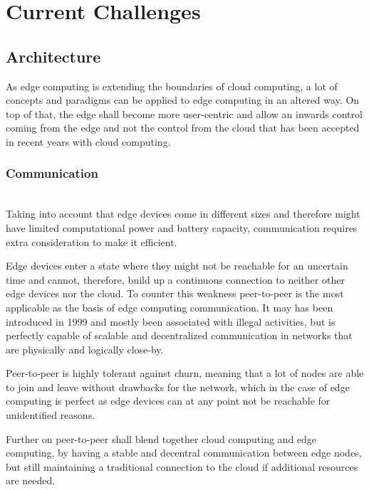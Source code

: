 \section{Current Challenges}\label{sec:main}

\subsection{Architecture}
As edge computing is extending the boundaries of cloud computing, a lot of concepts and paradigms can be applied to edge computing in an altered way. On top of that, the edge shall become more user-centric and allow an inwards control coming from the edge and not the control from the cloud that has been accepted in recent years with cloud computing.

\subsubsection{Communication}\hspace*{\fill} \\
Taking into account that edge devices come in different sizes and therefore might have limited computational power and battery capacity, communication requires extra consideration to make it efficient.

Edge devices enter a state where they might not be reachable for an uncertain time and cannot, therefore, build up a continuous connection to neither other edge devices nor the cloud.
To counter this weakness peer-to-peer is the most applicable as the basis of edge computing communication. It may has been introduced in 1999 and mostly been associated with illegal activities, but is perfectly capable of scalable and decentralized communication in networks that are physically and logically close-by. 

Peer-to-peer is highly tolerant against churn, meaning that a lot of nodes are able to join and leave without drawbacks for the network, which in the case of edge computing is perfect as edge devices can at any point not be reachable for unidentified reasons.

Further on peer-to-peer shall blend together cloud computing and edge computing, by having a stable and decentral communication between edge nodes, but still maintaining a traditional connection to the cloud if additional resources are needed. 

